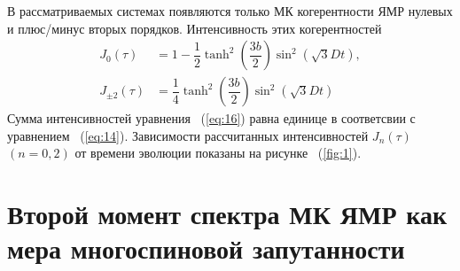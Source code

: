\documentclass[review]{elsarticle}
\begin{document}
В рассматриваемых системах появляются только МК когерентности ЯМР нулевых и плюс/минус вторых порядков.
Интенсивность этих когерентностей
%
\begin{equation}
    \begin{split}
        \label{eq:16}
        J_0(\tau) & = 1 
        - \dfrac 1 2 \tanh^2\left( \dfrac{3b}{2} \right)
            \sin^2 \left( \sqrt{3} Dt \right), 
        \\
        J_{\pm2}(\tau) & = \dfrac{1}{4} 
            \tanh^2 \left( \dfrac{3b}{2} \right)
            \sin^2 \left( \sqrt{3} Dt \right)
    \end{split}
\end{equation}
%
Сумма интенсивностей уравнения ~(\ref{eq:16}) равна единице в соответсвии с уравнением ~(\ref{eq:14}).
Зависимости рассчитанных интенсивностей $J_{n}(\tau)$ $(n=0,2)$ от времени эволюции показаны на рисунке ~(\ref{fig:1}).



\section{Второй момент спектра МК ЯМР как мера многоспиновой запутанности}
\label{sec:4}
\end{document}
